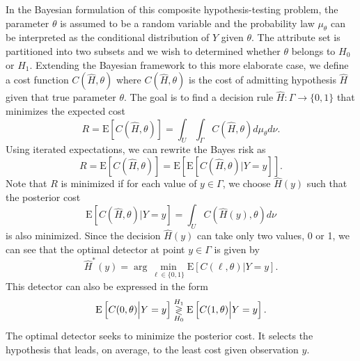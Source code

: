 In the Bayesian formulation of this composite hypothesis-testing problem, the parameter $\theta$ is assumed to be a random variable and the probability law $\mu_{\theta}$ can be interpreted as the conditional distribution of $Y$ given $\theta$.
The attribute set is partitioned into two subsets and we wish to determined whether $\theta$ belongs to $H_0$ or $H_1$.
Extending the Bayesian framework to this more elaborate case, we define a cost function $C(\hat{H}, \theta)$ where $C(\hat{H}, \theta)$ is the cost of admitting hypothesis $\hat{H}$ given that true parameter $\theta$.
The goal is to find a decision rule $\hat{H} : \Gamma \rightarrow \{ 0, 1 \}$ that minimizes the expected cost
\begin{equation*}
R = \mathrm{E} \left[ C(\hat{H}, \theta) \right]
= \int_{U} \int_{\Gamma} C(\hat{H}, \theta) d\mu_{\theta} d\nu .
\end{equation*}
Using iterated expectations, we can rewrite the Bayes risk as
\begin{equation*}
R = \mathrm{E} \left[ C(\hat{H}, \theta) \right]
= \mathrm{E} \left[ \mathrm{E} \left[ C(\hat{H}, \theta) \Big| Y = y \right] \right] .
\end{equation*}
Note that $R$ is minimized if for each value of $y \in \Gamma$, we choose $\hat{H}(y)$ such that the posterior cost
\begin{equation*}
\mathrm{E} \left[ C(\hat{H}, \theta) \Big| Y = y \right]
= \int_U C(\hat{H}(y), \theta) d\nu
\end{equation*}
is also minimized.
Since the decision $\hat{H}(y)$ can take only two values, 0 or 1, we can see that the optimal detector at point $y \in \Gamma$ is given by
\begin{equation*}
\hat{H}^* (y) = \arg \min_{\ell \in \{ 0, 1 \}}
\mathrm{E} \left[ C(\ell, \theta) \Big| Y = y \right] .
\end{equation*}
This detector can also be expressed in the form
\begin{equation} \label{equation:DecisionRuleCompositeHT}
\mathrm{E} \left[ C(0, \theta) \Big| Y = y \right]
\overset{H_1}{ \underset{H_0}{\gtrless} }
\mathrm{E} \left[ C(1, \theta) \Big| Y = y \right] .
\end{equation}
The optimal detector seeks to minimize the posterior cost.
It selects the hypothesis that leads, on average, to the least cost given observation $y$.

